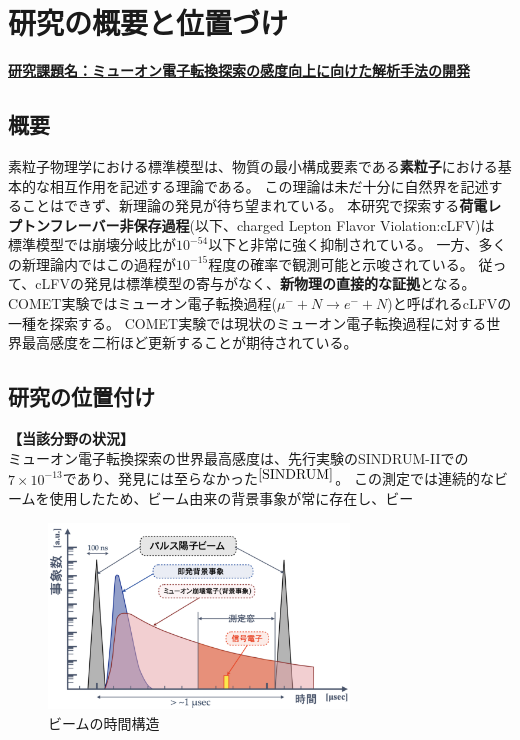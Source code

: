 \documentclass[11pt,a4j,dvipdfmx]{jarticle} 					%
\newcommand{\研究課題名}{ミューオン電子転換探索の感度向上に向けた解析手法の開発}
\newcommand{\研究機関名}{大阪大学}
\newcommand{\研究代表者氏名}{高見 翔太   }
\newcommand{\mysubsection}[1]{\vspace{-20pt}\subsection*{\colorbox{cyan!15}{\normalsize{#1}}}\vspace{-0.2cm}}
\begin{document}

\section{研究の概要と位置づけ}

\noindent
\underline{\textbf{研究課題名：\研究課題名}}

\vspace{0.1cm}
\mysubsection{概要}

素粒子物理学における標準模型は、物質の最小構成要素である\textbf{素粒子}における基本的な相互作用を記述する理論である。
この理論は未だ十分に自然界を記述することはできず、新理論の発見が待ち望まれている。
本研究で探索する\textbf{荷電レプトンフレーバー非保存過程}(以下、charged Lepton Flavor Violation:cLFV)は
標準模型では崩壊分岐比が$10^{-54}$以下と非常に強く抑制されている。
一方、多くの新理論内ではこの過程が$10^{-15}$程度の確率で観測可能と示唆されている。
従って、cLFVの発見は標準模型の寄与がなく、\textbf{新物理の直接的な証拠}となる。
COMET実験ではミューオン電子転換過程($\mu^- + N \rightarrow e^- + N$)と呼ばれるcLFVの一種を探索する。
COMET実験では現状のミューオン電子転換過程に対する世界最高感度を二桁ほど更新することが期待されている。
\mysubsection{研究の位置付け}
\noindent \textbf{【当該分野の状況】}\\
ミューオン電子転換探索の世界最高感度は、先行実験のSINDRUM-I\hspace{-1.2pt}Iでの$7 \times 10^{-13}$であり、発見には至らなかった$^{\cite{SINDRUM}}$。
この測定では連続的なビームを使用したため、ビーム由来の背景事象が常に存在し、ビー
\begin{figure}{}
	\centering
	 \vspace{-0.5cm}
	 \hspace*{-15pt}
	 \includegraphics[width=8cm]{figs/beam}
	 \vspace{-1.2cm}
	 \caption{\small{ビームの時間構造}}
	 \label{Fig:beam}
	\end{figure} 
\end{document}
